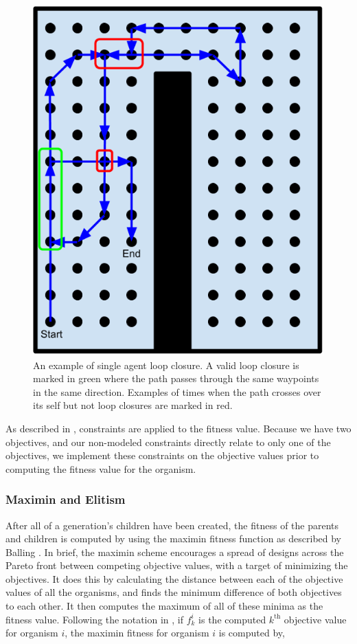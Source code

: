 \documentclass[letterpaper, 10 pt, conference]{ieeeconf}  %
\begin{document}
\begin{figure}
\centering
\includegraphics[width=1.0\linewidth]{figures/loop_closure.png}
\caption{An example of single agent loop closure. A valid loop closure is marked in green where the path passes through the same waypoints in the same direction. Examples of times when the path crosses over its self but not loop closures are marked in red.}
\label{fig:loop_closure}
\end{figure}

As described in \cite{Parkinson2019}, constraints are applied to the fitness value. Because we have two objectives, and our non-modeled constraints directly relate to only one of the objectives, we implement these constraints on the objective values prior to computing the fitness value for the organism.

\subsubsection{Maximin and Elitism}

After all of a generation's children have been created, the fitness of the parents and children is computed by using the maximin fitness function as described by Balling \cite{Balling2003}. In brief, the maximin scheme encourages a spread of designs across the Pareto front between competing objective values, with a target of minimizing the objectives. It does this by calculating the distance between each of the objective values of all the organisms, and finds the minimum difference of both objectives to each other. It then computes the maximum of all of these minima as the fitness value. Following the notation in \cite{Parkinson2019}, if $f_k^i$ is the computed $k^{\mathrm{th}}$ objective value for organism $i$, the maximin fitness for organism $i$ is computed by,
\end{document}
